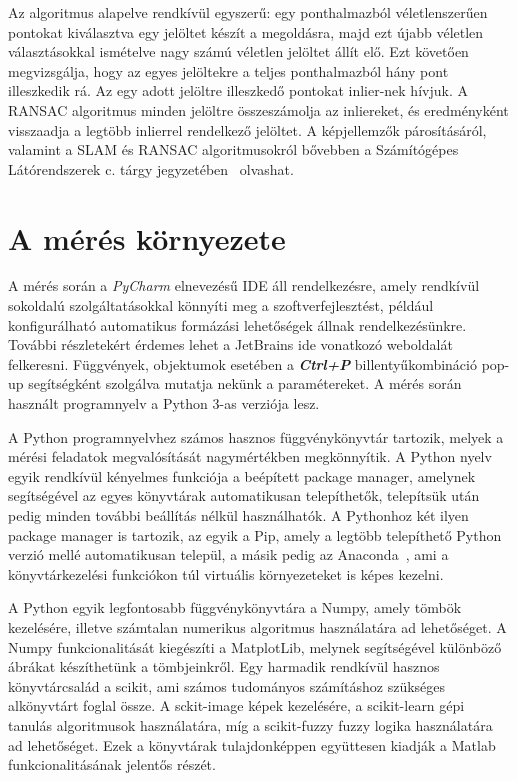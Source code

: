 \documentclass[12pt,a4paper,oneside]{report}             %
\begin{document}
Az algoritmus alapelve rendkívül egyszerű: egy ponthalmazból véletlenszerűen pontokat kiválasztva egy jelöltet készít a megoldásra, majd ezt újabb véletlen választásokkal ismételve nagy számú véletlen jelöltet állít elő. Ezt követően megvizsgálja, hogy az egyes jelöltekre a teljes ponthalmazból hány pont illeszkedik rá. Az egy adott jelöltre illeszkedő pontokat inlier-nek hívjuk. A RANSAC algoritmus minden jelöltre összeszámolja az inliereket, és eredményként visszaadja a legtöbb inlierrel rendelkező jelöltet. A képjellemzők párosításáról, valamint a SLAM és RANSAC algoritmusokról bővebben a Számítógépes Látórendszerek c. tárgy jegyzetében~\cite{szgl} olvashat.

\chapter{A mérés környezete}

A mérés során a \emph{PyCharm} elnevezésű IDE áll rendelkezésre, amely rendkívül sokoldalú szolgáltatásokkal könnyíti meg a szoftverfejlesztést, például konfigurálható automatikus formázási lehetőségek állnak rendelkezésünkre. További részletekért érdemes lehet a JetBrains ide vonatkozó weboldalát~\cite{pycharm} felkeresni. Függvények, objektumok esetében a \textbf{\textit{Ctrl+P}} billentyűkombináció pop-up segítségként szolgálva mutatja nekünk a paramétereket. A mérés során használt programnyelv a Python 3-as verziója lesz.

A Python programnyelvhez számos hasznos függvénykönyvtár tartozik, melyek a mérési feladatok megvalósítását nagymértékben megkönnyítik. A Python nyelv egyik rendkívül kényelmes funkciója a beépített package manager, amelynek segítségével az egyes könyvtárak automatikusan telepíthetők, telepítsük után pedig minden további beállítás nélkül használhatók. A Pythonhoz két ilyen package manager is tartozik, az egyik a Pip, amely a legtöbb telepíthető Python verzió mellé automatikusan települ, a másik pedig az Anaconda~\cite{conda}, ami a könyvtárkezelési funkciókon túl virtuális környezeteket is képes kezelni.

A Python egyik legfontosabb függvénykönyvtára a Numpy, amely tömbök kezelésére, illetve számtalan numerikus algoritmus használatára ad lehetőséget. A Numpy funkcionalitását kiegészíti a MatplotLib, melynek segítségével különböző ábrákat készíthetünk a tömbjeinkről. Egy harmadik rendkívül hasznos könyvtárcsalád a scikit, ami számos tudományos számításhoz szükséges alkönyvtárt foglal össze. A sckit-image képek kezelésére, a scikit-learn gépi tanulás algoritmusok használatára, míg a scikit-fuzzy fuzzy logika használatára ad lehetőséget. Ezek a könyvtárak tulajdonképpen együttesen kiadják a Matlab funkcionalitásának jelentős részét.
\end{document}
